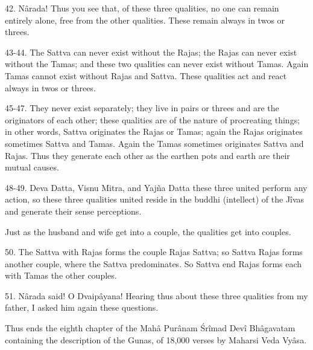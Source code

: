 42. N\^arada! Thus you see that, of these three qualities, no one can remain entirely alone, free from the other qualities. These remain always in twos or threes.

43-44. The Sattva can never exist without the Rajas; the Rajas can never exist without the Tamas; and these two qualities can never exist without Tamas. Again Tamas cannot exist without Rajas and Sattva. These qualities act and react always in twos or threes.

45-47. They never exist separately; they live in pairs or threes and are the originators of each other; these qualities are of the nature of procreating things; in other words, Sattva originates the Rajas or Tamas; again the Rajas originates sometimes Sattva and Tamas. Again the Tamas sometimes originates Sattva and Rajas. Thus they generate each other as the earthen pots and earth are their mutual causes.

48-49. Deva Datta, Visnu Mitra, and Yaj\~na Datta these three united perform any action, so these three qualities united reside in the buddhi (intellect) of the J\^ivas and generate their sense perceptions.

Just as the husband and wife get into a couple, the qualities get into couples.

50. The Sattva with Rajas forms the couple Rajas Sattva; so Sattva Rajas forms another couple, where the Sattva predominates. So Sattva end Rajas forms each with Tamas the other couples.

51. N\^arada said! O Dvaip\^ayana! Hearing thus about these three qualities from my father, I asked him again these questions.

Thus ends the eighth chapter of the Mah\^a Pur\^anam \'Sr\^imad Dev\^i Bh\^agavatam containing the description of the Gunas, of 18,000 verses by Maharsi Veda Vy\^asa.